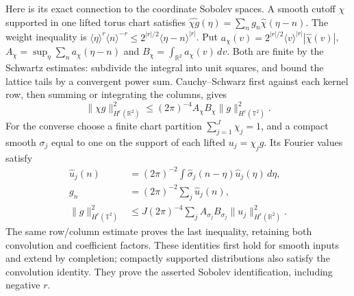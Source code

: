 \documentclass[
  11pt,
]{article}
\begin{document}
Here is its exact connection to the coordinate Sobolev spaces. A smooth
cutoff \(\chi\) supported in one lifted torus chart satisfies
\(\widehat{\chi g}(\eta)=\sum_n g_n\widehat\chi(\eta-n)\). The weight
inequality is \(\langle\eta\rangle^r\langle n\rangle^{-r}
 \leq2^{|r|/2}\langle\eta-n\rangle^{|r|}\). Put
\(a_\chi(v)=2^{|r|/2}\langle v\rangle^{|r|}|\widehat\chi(v)|\),
\(A_\chi=\sup_\eta\sum_n a_\chi(\eta-n)\) and
\(B_\chi=\int_{\mathbb R^2}a_\chi(v)\,dv\). Both are finite by the
Schwartz estimates: subdivide the integral into unit squares, and bound
the lattice tails by a convergent power sum. Cauchy--Schwarz first
against each kernel row, then summing or integrating the columns, gives
\[
 \|\chi g\|_{H^r(\mathbb R^2)}^2
       \leq(2\pi)^{-4}A_\chi B_\chi\|g\|_{H^r(\mathbb T^2)}^2.
 \tag{CF4}
\] For the converse choose a finite chart partition
\(\sum_{j=1}^J\chi_j=1\), and a compact smooth \(\sigma_j\) equal to one
on the support of each lifted \(u_j=\chi_jg\). Its Fourier values
satisfy \[
 \begin{aligned}
 \widehat u_j(n)&=(2\pi)^{-2}
       \int\widehat\sigma_j(n-\eta)\widehat u_j(\eta)\,d\eta,\\
 g_n&=(2\pi)^{-2}\sum_j\widehat u_j(n),\\
 \|g\|_{H^r(\mathbb T^2)}^2
 &\leq J(2\pi)^{-4}\sum_j A_{\sigma_j}B_{\sigma_j}
                            \|u_j\|_{H^r(\mathbb R^2)}^2.
 \end{aligned}
 \tag{CF5}
\] The same row/column estimate proves the last inequality, retaining
both convolution and coefficient factors. These identities first hold
for smooth inputs and extend by completion; compactly supported
distributions also satisfy the convolution identity. They prove the
asserted Sobolev identification, including negative \(r\).
\end{document}
